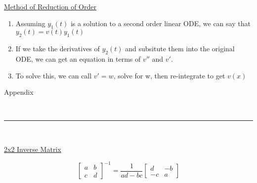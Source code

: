 \documentclass{article}
\begin{document}
\begin{center}
    \underline{Method of Reduction of Order}
    \begin{enumerate}
        \item Assuming $y_1(t)$ is a solution to a second order linear ODE, we can say that $y_2(t) = v(t)y_1(t)$
        \item If we take the derivatives of $y_2(t)$ and subsitute them into the original ODE, we can get an equation in terms of $v''$ and $v'$.
        \item To solve this, we can call $v' = w$, solve for w, then re-integrate to get $v(x)$
    \end{enumerate}
\end{center}

\pagebreak
\begin{large}
    \noindent Appendix
\end{large}\\
\rule{\textwidth}{0.5pt}\smallskip\\

\begin{multicols*}{3}
    \begin{center}
        \underline{2x2 Inverse Matrix}
    \end{center}
    \[
        \begin{bmatrix}
                a & b\\
                c & d
        \end{bmatrix}^{-1}
        =
        \frac{1}{ad -bc}
        \begin{bmatrix}
                d & -b\\
                -c & a
        \end{bmatrix}
    \]
\end{multicols*}
\end{document}
